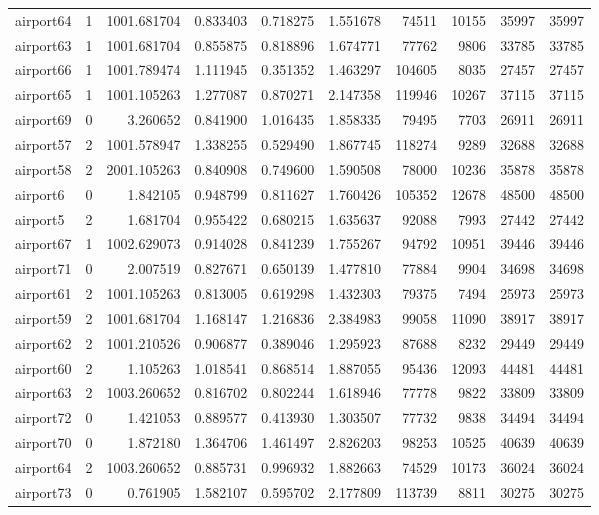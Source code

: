 \begin{longtable}{|l|r|r|r|r|r|r|r|r|r|}
airport64 & 1 & 1001.681704 & 0.833403 & 0.718275 & 1.551678 & 74511 & 10155 & 35997 & 35997 \\
airport63 & 1 & 1001.681704 & 0.855875 & 0.818896 & 1.674771 & 77762 & 9806 & 33785 & 33785 \\
airport66 & 1 & 1001.789474 & 1.111945 & 0.351352 & 1.463297 & 104605 & 8035 & 27457 & 27457 \\
airport65 & 1 & 1001.105263 & 1.277087 & 0.870271 & 2.147358 & 119946 & 10267 & 37115 & 37115 \\
airport69 & 0 & 3.260652 & 0.841900 & 1.016435 & 1.858335 & 79495 & 7703 & 26911 & 26911 \\
airport57 & 2 & 1001.578947 & 1.338255 & 0.529490 & 1.867745 & 118274 & 9289 & 32688 & 32688 \\
airport58 & 2 & 2001.105263 & 0.840908 & 0.749600 & 1.590508 & 78000 & 10236 & 35878 & 35878 \\
airport6 & 0 & 1.842105 & 0.948799 & 0.811627 & 1.760426 & 105352 & 12678 & 48500 & 48500 \\
airport5 & 2 & 1.681704 & 0.955422 & 0.680215 & 1.635637 & 92088 & 7993 & 27442 & 27442 \\
airport67 & 1 & 1002.629073 & 0.914028 & 0.841239 & 1.755267 & 94792 & 10951 & 39446 & 39446 \\
airport71 & 0 & 2.007519 & 0.827671 & 0.650139 & 1.477810 & 77884 & 9904 & 34698 & 34698 \\
airport61 & 2 & 1001.105263 & 0.813005 & 0.619298 & 1.432303 & 79375 & 7494 & 25973 & 25973 \\
airport59 & 2 & 1001.681704 & 1.168147 & 1.216836 & 2.384983 & 99058 & 11090 & 38917 & 38917 \\
airport62 & 2 & 1001.210526 & 0.906877 & 0.389046 & 1.295923 & 87688 & 8232 & 29449 & 29449 \\
airport60 & 2 & 1.105263 & 1.018541 & 0.868514 & 1.887055 & 95436 & 12093 & 44481 & 44481 \\
airport63 & 2 & 1003.260652 & 0.816702 & 0.802244 & 1.618946 & 77778 & 9822 & 33809 & 33809 \\
airport72 & 0 & 1.421053 & 0.889577 & 0.413930 & 1.303507 & 77732 & 9838 & 34494 & 34494 \\
airport70 & 0 & 1.872180 & 1.364706 & 1.461497 & 2.826203 & 98253 & 10525 & 40639 & 40639 \\
airport64 & 2 & 1003.260652 & 0.885731 & 0.996932 & 1.882663 & 74529 & 10173 & 36024 & 36024 \\
airport73 & 0 & 0.761905 & 1.582107 & 0.595702 & 2.177809 & 113739 & 8811 & 30275 & 30275 \\

\end{longtable}
